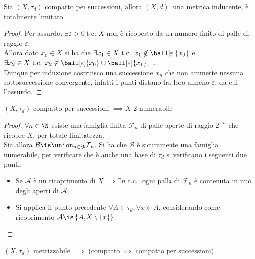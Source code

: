 \begin{prop}
Sia $(X,\tau _d)$ compatto per successioni, allora $(X,d)$, una metrica inducente, è totalmente limitato
\end{prop}
\begin{proof}
Per assurdo: $\exists \varepsilon > 0 \text{ t.c. } X$ non è ricoperto da un numero finito di palle di raggio $\varepsilon$.\\
Allora dato $x_0 \in X$ si ha che $\exists x_1 \in X \text{ t.c. } x_1 \not \in \ball[\varepsilon]{x_0}$ e $\exists x_2 \in X \text{ t.c. } x_2 \not \in \ball[\varepsilon]{x_0} \cup \ball[\varepsilon]{x_1}$, \dots .\\
Dunque per induzione costruisco una successione $x_n$ che non ammette nessuna sottosuccessione convergente, infatti i punti distano fra loro almeno $\varepsilon$, da cui l'assurdo.
\end{proof}

\begin{prop}
$(X, \tau _d)$ compatto per successioni $\implies X$ 2-numerabile
\end{prop}
\begin{proof}
$\forall n \in \N$ esiste una famiglia finita $\mathcal{F}_n$ di palle aperte di raggio $2^{-n}$ che ricopre $X$, per totale limitatezza.\\
Sia allora $\mathcal{B} \is \union _{n \in \N} \mathcal F_n$. Si ha che $\mathcal{B}$ è sicuramente una famiglia numerabile, per verificare che è anche una base di $\tau _d$ si verificano i seguenti due punti:
\begin{itemize}
\item Se $\mathcal{A}$ è un ricoprimento di $X \implies \exists \bar{n} \text{ t.c. }$ ogni palla di $\mathcal{F}_n$ è contenuta in uno degli aperti di $\mathcal{A}$;
\item Si applica il punto precedente $\forall A \in \tau _d , \forall x \in A$, considerando come ricoprimento $\mathcal{A} \is \left\{ {A, X\setminus \left\{ {x}\right\}}\right\}$
\end{itemize}
\end{proof}

\begin{cor}
$(X,\tau _d)$ metrizzabile $\implies$ (compatto $\iff$ compatto per successioni)
\end{cor}

